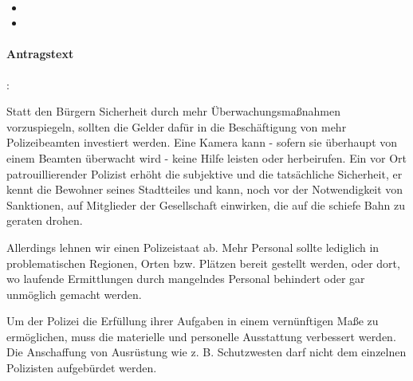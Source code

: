 

\label{wpa:polizei3}
\\
\begin{itemize}
\item {}
\item {}
\end{itemize}

\paragraph{Antragstext}:

Statt den Bürgern Sicherheit durch mehr Überwachungsmaßnahmen vorzuspiegeln, sollten die Gelder dafür in die Beschäftigung von mehr Polizeibeamten investiert werden. Eine Kamera kann - sofern sie überhaupt von einem Beamten überwacht wird - keine Hilfe leisten oder herbeirufen. Ein vor Ort patrouillierender Polizist erhöht die subjektive und die tatsächliche Sicherheit, er kennt die Bewohner {\Gu}seines{\Go} Stadtteiles und kann, noch vor der Notwendigkeit von Sanktionen, auf Mitglieder der Gesellschaft einwirken, die auf die schiefe Bahn zu geraten drohen.

Allerdings lehnen wir einen Polizeistaat ab. Mehr Personal sollte lediglich in problematischen Regionen, Orten bzw. Plätzen bereit gestellt werden, oder dort, wo laufende Ermittlungen durch mangelndes Personal behindert oder gar unmöglich gemacht werden.

Um der Polizei die Erfüllung ihrer Aufgaben in einem vernünftigen Maße zu ermöglichen, muss die materielle und personelle Ausstattung verbessert werden. Die Anschaffung von Ausrüstung wie z. B. Schutzwesten darf nicht dem einzelnen Polizisten aufgebürdet werden. 


